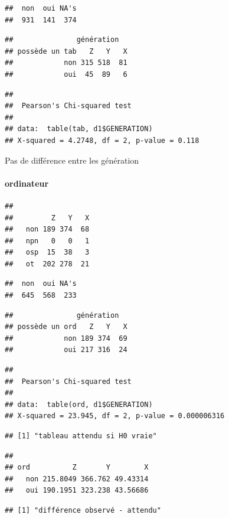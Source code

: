 \documentclass[]{article}
\begin{document}
\begin{verbatim}
##  non  oui NA's 
##  931  141  374
\end{verbatim}

\begin{verbatim}
##               génération
## possède un tab   Z   Y   X
##            non 315 518  81
##            oui  45  89   6
\end{verbatim}

\begin{verbatim}
## 
##  Pearson's Chi-squared test
## 
## data:  table(tab, d1$GENERATION)
## X-squared = 4.2748, df = 2, p-value = 0.118
\end{verbatim}

Pas de différence entre les génération

\paragraph{ordinateur}\label{ordinateur}

\begin{verbatim}
##      
##         Z   Y   X
##   non 189 374  68
##   npn   0   0   1
##   osp  15  38   3
##   ot  202 278  21
\end{verbatim}

\begin{verbatim}
##  non  oui NA's 
##  645  568  233
\end{verbatim}

\begin{verbatim}
##               génération
## possède un ord   Z   Y   X
##            non 189 374  69
##            oui 217 316  24
\end{verbatim}

\begin{verbatim}
## 
##  Pearson's Chi-squared test
## 
## data:  table(ord, d1$GENERATION)
## X-squared = 23.945, df = 2, p-value = 0.000006316
\end{verbatim}

\begin{verbatim}
## [1] "tableau attendu si H0 vraie"
\end{verbatim}

\begin{verbatim}
##      
## ord          Z       Y        X
##   non 215.8049 366.762 49.43314
##   oui 190.1951 323.238 43.56686
\end{verbatim}

\begin{verbatim}
## [1] "différence observé - attendu"
\end{verbatim}
\end{document}
